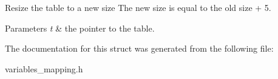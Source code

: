 Resize the table to a new size The new size is equal to the old size + 5. 


\begin{DoxyParams}{Parameters}
{\em t} & the pointer to the table. \\
\hline
\end{DoxyParams}


The documentation for this struct was generated from the following file\-:\begin{DoxyCompactItemize}
\item 
variables\-\_\-mapping.\-h\end{DoxyCompactItemize}
